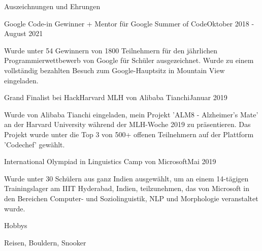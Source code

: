 \documentclass[
	a4paper, %
	10pt, %
]{resume} %
\begin{document}
\begin{rSection}{Auszeichnungen und Ehrungen}

	\begin{achSubsection}{Google Code-in Gewinner + Mentor für Google Summer of Code}{Oktober 2018 - August 2021}
		\item Wurde unter 54 Gewinnern von 1800 Teilnehmern für den jährlichen Programmierwettbewerb von Google für Schüler ausgezeichnet. Wurde zu einem vollständig bezahlten Besuch zum Google-Hauptsitz in Mountain View eingeladen.
	\end{achSubsection}




	\begin{achSubsection}{Grand Finalist bei HackHarvard MLH von Alibaba Tianchi}{Januar 2019}
		\item Wurde von Alibaba Tianchi eingeladen, mein Projekt 'ALM8 - Alzheimer's Mate' an der Harvard University während der MLH-Woche 2019 zu präsentieren. Das Projekt wurde unter die Top 3 von 500+ offenen Teilnehmern auf der Plattform 'Codechef' gewählt.
	\end{achSubsection}


	\begin{achSubsection}{International Olympiad in Linguistics Camp von Microsoft}{Mai 2019}
		\item Wurde unter 30 Schülern aus ganz Indien ausgewählt, um an einem 14-tägigen Trainingslager am IIIT Hyderabad, Indien, teilzunehmen, das von Microsoft in den Bereichen Computer- und Soziolinguistik, NLP und Morphologie veranstaltet wurde.
	\end{achSubsection}

\end{rSection}

\begin{rSection}{Hobbys}

	Reisen, Bouldern, Snooker


\end{rSection}
\end{document}
